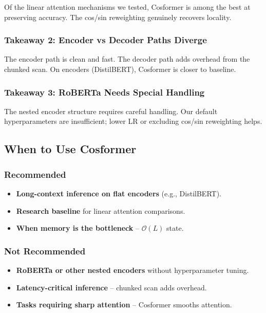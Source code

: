 Of the linear attention mechanisms we tested, Cosformer is among the best 
at preserving accuracy. The cos/sin reweighting genuinely recovers locality.

\subsubsection{Takeaway 2: Encoder vs Decoder Paths Diverge}

The encoder path is clean and fast. The decoder path adds overhead from 
the chunked scan. On encoders (DistilBERT), Cosformer is closer to baseline.

\subsubsection{Takeaway 3: RoBERTa Needs Special Handling}

The nested encoder structure requires careful handling. Our default 
hyperparameters are insufficient; lower LR or excluding cos/sin reweighting 
helps.

\subsection{When to Use Cosformer}

\subsubsection{Recommended}

\begin{itemize}
\item \textbf{Long-context inference on flat encoders} (e.g., DistilBERT).
\item \textbf{Research baseline} for linear attention comparisons.
\item \textbf{When memory is the bottleneck} -- $\mathcal{O}(L)$ state.

\end{itemize}
\subsubsection{Not Recommended}

\begin{itemize}
\item \textbf{RoBERTa or other nested encoders} without hyperparameter tuning.
\item \textbf{Latency-critical inference} -- chunked scan adds overhead.
\item \textbf{Tasks requiring sharp attention} -- Cosformer smooths attention.

\end{itemize}

